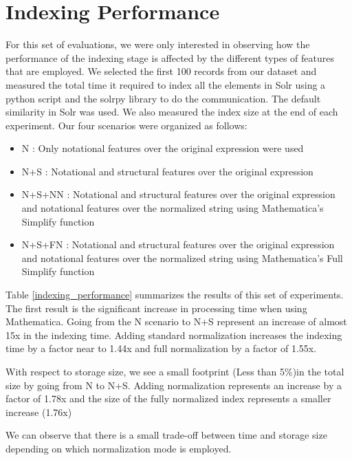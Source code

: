 \section{Indexing Performance}
For this set of evaluations, we were only interested in observing how the performance of the indexing stage is affected by the different types of features that are employed. We selected the first 100 records from our dataset and measured the total time it required to index all the elements in Solr using a python script and the solrpy library to do the communication. The default similarity in Solr was used. We also measured the index size at the end of each experiment.
Our four scenarios were organized as follows:
\begin{itemize}
\item N : Only notational features over the original expression were used
\item N+S : Notational and structural features over the original expression
\item N+S+NN : Notational and structural features over the original expression and notational features over the normalized string using Mathematica's Simplify function
\item N+S+FN : Notational and structural features over the original expression and notational features over the normalized string using Mathematica's Full Simplify function
\end{itemize}

Table \ref{indexing_performance} summarizes the results of this set of experiments. The first result is the significant increase in processing time when using Mathematica. Going from the N scenario to N+S represent an increase of almost 15x in the indexing time. Adding standard normalization increases the indexing time by a factor near to 1.44x and full normalization by a factor of 1.55x.

With respect to storage size, we see a small footprint (Less than 5\%)in the total size by going from N to N+S. Adding normalization represents an increase by a factor of 1.78x and the size of the fully normalized index represents a smaller increase (1.76x)

We can observe that there is a small trade-off between time and storage size depending on which normalization mode is employed.

